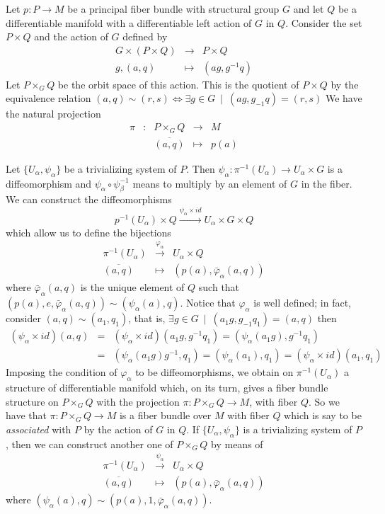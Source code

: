 \documentclass[12pt]{article}
\theoremstyle{plain}
\def\beann{\begin{eqnarray*}}
\def\eeann{\end{eqnarray*}}
\def\mapping#1{\mathrel{\mathop{\longrightarrow}\limits^{#1}}}
\begin{document}
Let $p : P \to M$ be
a principal fiber bundle with structural group $G$
and let $Q$ be a differentiable manifold
with a differentiable left action of $G$ in $Q$.
Consider the set $P \times Q$
and the action of $G$ defined by
$$\begin{array}{ccc}
G \times (P \times Q) & \to & P \times Q
\\
g,(a,q) & \mapsto & (ag, g^{-1}q)
\end{array}$$
Let $P \times_G Q$ be the orbit space of this action.
This is the quotient of $P \times Q$ by the equivalence relation
$(a,q) \sim (r,s) \Leftrightarrow \exists g \in G \
\mid \ (ag,g_{-1}q) = (r,s)$
We have the natural projection
$$
\begin{array}{ccccc}
\pi & : & P \times_G Q & \to & M
\\
& & \overline{(a,q)} & \mapsto & p(a)
\end{array}
$$

Let $\{ U_{\alpha},\psi_{\alpha} \}$ be
a trivializing system of $P$. Then
$\psi_{\alpha} : \pi^{-1}(U_{\alpha}) \to U_{\alpha} \times G$
is a diffeomorphism and
$\psi_{\alpha} \circ \psi_{\beta}^{-1}$
means to multiply by an element of $G$ in the fiber.
We can construct the diffeomorphisms
$$
p^{-1}(U_{\alpha}) \times Q \mapping{\psi_{\alpha} \times id}
U_{\alpha} \times G \times Q
$$
which allow us to define the bijections
$$\begin{array}{ccc}
\pi^{-1}(U_{\alpha}) & \mapping{\varphi_{\alpha}} & U_{\alpha} \times Q
\\
\overline{(a,q)} & \mapsto & (p(a),\bar\varphi_{\alpha}(a,q))
\end{array}$$
where $\bar\varphi_{\alpha}(a,q)$
is the unique element of $Q$ such that
$(p(a),e,\bar\varphi_{\alpha}(a,q)) \sim (\psi_{\alpha}(a),q)$.
Notice that $\varphi_{\alpha}$
is well defined; in fact,
consider $(a,q) \sim (a_1,q_1)$,
that is, $\exists g \in G \ \mid \ (a_1g,g_{-1}q_1) = (a,q)$
then
\beann
(\psi_{\alpha} \times id)(a,q) &=&
(\psi_{\alpha} \times id)(a_1g,g^{-1}q_1) =
(\psi_{\alpha}(a_1g),g^{-1}q_1)
\\ &=&
(\psi_{\alpha}(a_1g)g^{-1},q_1) =
(\psi_{\alpha}(a_1),q_1) =
(\psi_{\alpha} \times id)(a_1,q_1)
\eeann
Imposing the condition of $\varphi_{\alpha}$
to be diffeomorphisms,
we obtain on $\pi^{-1}(U_{\alpha})$
a structure of differentiable manifold which,
on its turn, gives a fiber bundle structure on
$P \times_G Q$ with the projection $\pi : P \times_G Q \to M$,
with fiber $Q$. So we have that $\pi : P \times_G Q \to M$
is a fiber bundle over $M$ with fiber $Q$ which is say to be
{\it associated} with $P$ by the action of $G$ in $Q$.
If $\{ U_{\alpha},\psi_{\alpha} \}$ is a trivializing system of $P$,
then we can construct another one of $P \times_G Q$
by means of
$$
\begin{array}{ccc}
\pi^{-1}(U_{\alpha}) & \mapping{\psi_{\alpha}} & U_{\alpha} \times Q
\\
\overline{(a,q)} & \mapsto & (p(a),\bar\varphi_{\alpha}(a,q))
\end{array}
$$
where $(\psi_{\alpha}(a),q) \sim (p(a),1,\bar\varphi_{\alpha}(a,q))$.
\end{document}
